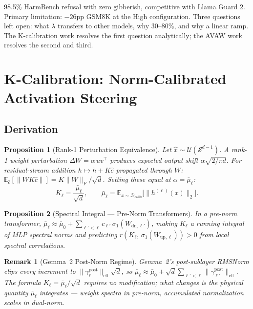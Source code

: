 \documentclass[11pt,a4paper]{article}
\newtheorem{proposition}{Proposition}
\newtheorem{remark}{Remark}
\begin{document}
98.5\% HarmBench refusal with zero gibberish, competitive with Llama Guard 2.
Primary limitation: $-26$pp GSM8K at the High configuration.
Three questions left open: what $\lambda$ transfers to other models, why
30--80\%, and why a linear ramp.
The K-calibration work resolves the first question analytically; the AVAW work resolves the second and third.

\section{K-Calibration: Norm-Calibrated Activation Steering}
\label{sec:paper1}

\subsection{Derivation}

\begin{proposition}[Rank-1 Perturbation Equivalence]
\label{prop:rank1}
Let $\hat{x} \sim \mathcal{U}(\mathcal{S}^{d-1})$.
A rank-1 weight perturbation $\Delta W = \alpha\,u v^\top$ produces expected
output shift $\alpha\sqrt{2/\pi d}$.
For residual-stream addition $h \mapsto h + K\hat{c}$ propagated through $W$:
$\mathbb{E}_{\hat{c}}[\|WK\hat{c}\|] = K\|W\|_F/\sqrt{d}$.
Setting these equal at $\alpha = \bar{\mu}_\ell$:
\[
  \boxed{K_\ell = \frac{\bar{\mu}_\ell}{\sqrt{d}}}, \qquad
  \bar{\mu}_\ell = \mathbb{E}_{x\sim\mathcal{D}_{\text{calib}}}\bigl[\|h^{(\ell)}(x)\|_2\bigr].
\]
\end{proposition}

\begin{proposition}[Spectral Integral — Pre-Norm Transformers]
\label{prop:integral}
In a pre-norm transformer,
$\bar{\mu}_\ell \approx \bar{\mu}_0 + \sum_{\ell'<\ell} c_{\ell'}\,\sigma_1(W_{\mathrm{dn},\ell'})$,
making $K_\ell$ a running integral of MLP spectral norms and predicting
$r(K_\ell,\,\sigma_1(W_{\mathrm{up},\ell})) > 0$ from local spectral correlations.
\end{proposition}

\begin{remark}[Gemma~2 Post-Norm Regime]
Gemma~2's post-sublayer RMSNorm clips every increment to
$\|\gamma^\mathrm{post}_\ell\|_\mathrm{eff}\sqrt{d}$, so
$\bar{\mu}_\ell \approx \bar{\mu}_0 + \sqrt{d}\sum_{\ell'<\ell}\|\gamma^\mathrm{post}_{\ell'}\|_\mathrm{eff}$.
The formula $K_\ell = \bar{\mu}_\ell/\sqrt{d}$ requires no modification;
what changes is the physical quantity $\bar{\mu}_\ell$ integrates — weight
spectra in pre-norm, accumulated normalization scales in dual-norm.
\end{remark}
\end{document}
